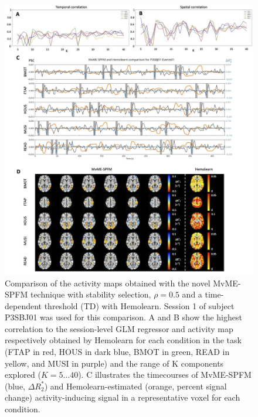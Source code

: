 \begin{figure}[ht!]
    \centerline{\includegraphics[width=\textwidth]{figures/multivariate/hemolearn_comparison.jpg}}
    \caption{Comparison of the activity maps obtained with the novel MvME-SPFM
    technique with stability selection, $\rho=0.5$ and a time-dependent
    threshold (TD) with Hemolearn. Session 1 of subject P3SBJ01 was used for
    this comparison. A and B show the highest correlation to the session-level
    GLM regressor and activity map respectively obtained by Hemolearn for each
    condition in the task (FTAP in red, HOUS in dark blue, BMOT in green, READ
    in yellow, and MUSI in purple) and the range of K components explored
    ($K=5\dots40$). C illustrates the timecourses of MvME-SPFM (blue, $\Delta
    R_2^*$) and Hemolearn-estimated (orange, percent signal change)
    activity-inducing signal in a representative voxel for each condition.}
\label{fig:hemolearn_comparison}
\end{figure}
\begin{figure}[ht!]
\end{figure}

